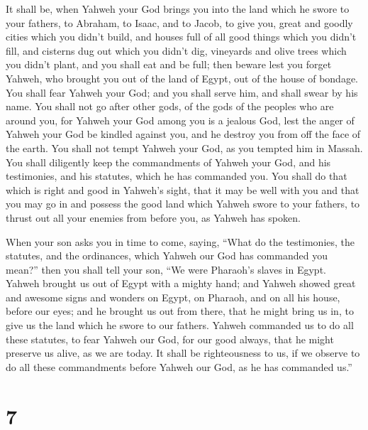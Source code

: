  It shall be, when Yahweh your God brings you into the land
which he swore to your fathers, to Abraham, to Isaac, and to Jacob, to
give you, great and goodly cities which you didn't build, 
and houses full of all good things which you didn't fill, and cisterns
dug out which you didn't dig, vineyards and olive trees which you didn't
plant, and you shall eat and be full;  then beware lest you
forget Yahweh, who brought you out of the land of Egypt, out of the
house of bondage.  You shall fear Yahweh your God; and you
shall serve him, and shall swear by his name.  You shall
not go after other gods, of the gods of the peoples who are around you,
 for Yahweh your God among you is a jealous God, lest the
anger of Yahweh your God be kindled against you, and he destroy you from
off the face of the earth.  You shall not tempt Yahweh your
God, as you tempted him in Massah.  You shall diligently
keep the commandments of Yahweh your God, and his testimonies, and his
statutes, which he has commanded you.  You shall do that
which is right and good in Yahweh's sight, that it may be well with you
and that you may go in and possess the good land which Yahweh swore to
your fathers,  to thrust out all your enemies from before
you, as Yahweh has spoken.

 When your son asks you in time to come, saying, ``What do
the testimonies, the statutes, and the ordinances, which Yahweh our God
has commanded you mean?''  then you shall tell your son,
``We were Pharaoh's slaves in Egypt. Yahweh brought us out of Egypt with
a mighty hand;  and Yahweh showed great and awesome signs
and wonders on Egypt, on Pharaoh, and on all his house, before our eyes;
 and he brought us out from there, that he might bring us
in, to give us the land which he swore to our fathers. 
Yahweh commanded us to do all these statutes, to fear Yahweh our God,
for our good always, that he might preserve us alive, as we are today.
 It shall be righteousness to us, if we observe to do all
these commandments before Yahweh our God, as he has commanded us.''

\hypertarget{section-6}{%
\section{7}\label{section-6}}

